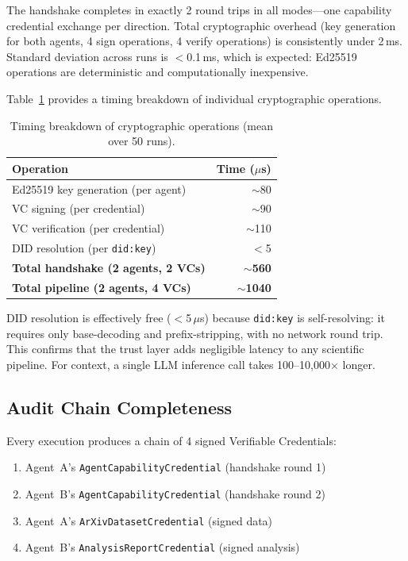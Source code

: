 \documentclass[11pt]{article}
\newcommand{\didkey}{\texttt{did:key}}
\newcommand{\vcs}{Verifiable Credentials}
\begin{document}
The handshake completes in exactly 2 round trips in all modes---one capability credential exchange per direction. Total cryptographic overhead (key generation for both agents, 4 sign operations, 4 verify operations) is consistently under 2\,ms. Standard deviation across runs is $<$0.1\,ms, which is expected: Ed25519 operations are deterministic and computationally inexpensive.

Table~\ref{tab:breakdown} provides a timing breakdown of individual cryptographic operations.

\begin{table}[t]
\centering
\caption{Timing breakdown of cryptographic operations (mean over 50 runs).}
\label{tab:breakdown}
\begin{tabular}{@{}lr@{}}
\toprule
\textbf{Operation} & \textbf{Time ($\mu$s)} \\
\midrule
Ed25519 key generation (per agent)    & $\sim$80 \\
VC signing (per credential)           & $\sim$90 \\
VC verification (per credential)      & $\sim$110 \\
DID resolution (per \didkey{})        & $<$5 \\
\midrule
\textbf{Total handshake (2 agents, 2 VCs)} & $\sim$\textbf{560} \\
\textbf{Total pipeline (2 agents, 4 VCs)}  & $\sim$\textbf{1040} \\
\bottomrule
\end{tabular}
\end{table}

DID resolution is effectively free ($<$5\,$\mu$s) because \didkey{} is self-resolving: it requires only base-decoding and prefix-stripping, with no network round trip. This confirms that the trust layer adds negligible latency to any scientific pipeline. For context, a single LLM inference call takes 100--10,000$\times$ longer.

\subsection{Audit Chain Completeness}

Every execution produces a chain of 4 signed \vcs{}:

\begin{enumerate}[nosep,leftmargin=1.5em]
  \item Agent~A's \texttt{AgentCapabilityCredential} (handshake round 1)
  \item Agent~B's \texttt{AgentCapabilityCredential} (handshake round 2)
  \item Agent~A's \texttt{ArXivDatasetCredential} (signed data)
  \item Agent~B's \texttt{AnalysisReportCredential} (signed analysis)
\end{enumerate}
\end{document}
